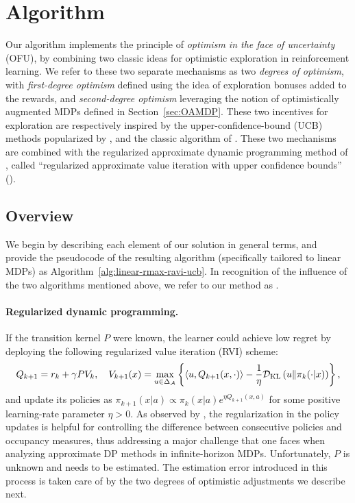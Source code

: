 \section{Algorithm}
\label{sec:algo}

Our algorithm implements the principle of \emph{optimism in the face of uncertainty} (OFU), by combining two classic ideas for optimistic exploration in reinforcement learning. We refer to these two separate mechanisms as two \emph{degrees of optimism}, with \emph{first-degree optimism} defined using the idea of exploration bonuses added to the rewards, and \emph{second-degree optimism} leveraging the notion of optimistically augmented MDPs defined in Section~\ref{sec:OAMDP}. These two incentives for exploration are respectively inspired by the upper-confidence-bound (UCB) methods popularized by \cite{azar2017minimax}, and the classic \RMAXalg algorithm of \citet{brafman2002r}. These two mechanisms are combined with the regularized approximate dynamic programming method of \citet{MN23}, called ``regularized approximate value iteration with upper confidence bounds'' (\raviUCB). 


\subsection{Overview}

We begin by describing each element of our solution in general terms, and provide the pseudocode of the resulting algorithm (specifically tailored to linear MDPs) as Algorithm~\ref{alg:linear-rmax-ravi-ucb}. In recognition of the influence of the two algorithms mentioned above, we refer to our method as \algname.

\paragraph{Regularized dynamic programming.} If the transition kernel $P$ were known, the learner could achieve low regret by deploying the following regularized value iteration (RVI) scheme:
%
\begin{align} \label{eq:DPupdate}
    Q_{k+1} = r_k + \gamma P V_k, ~~~ V_{k+1}(x) = \max_{u\in\Delta_{\mathcal{A}}} \left\{\left\langle{u},{Q_{k+1}(x,\cdot)}\right\rangle - \frac{1}{\eta} \mathcal{D}_{\text{KL}}\left(u \middle\|\pi_k(\cdot|x)\right)\right\},
\end{align}
%
and update its policies as $\pi_{k+1}(x|a) \propto \pi_{k}(x|a)e^{\eta Q_{k+1} (x, a)}$ for some positive learning-rate parameter $\eta > 0$. As observed by \citet{MN23}, the regularization in the policy updates is helpful for controlling the difference between consecutive policies and occupancy measures, thus addressing a major challenge that one faces when analyzing approximate DP methods in infinite-horizon MDPs. Unfortunately, $P$ is unknown and needs to be estimated. The estimation error introduced in this process is taken care of by the two degrees of optimistic adjustments we describe next.


